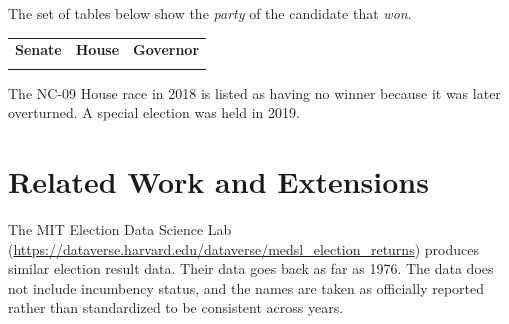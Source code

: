 \documentclass[12pt]{article}
\begin{document}
The set of tables below show the \emph{party} of the candidate that \emph{won}.

    \begin{tabularx}{\linewidth}{CCC}
    \textbf{Senate} & \textbf{House} & \textbf{Governor}\\
     &  & 
    \end{tabularx}

The NC-09 House race in 2018 is listed as having no winner because it was later overturned. A special election was held in 2019.





\section{Related Work and Extensions}

The MIT Election Data Science Lab (\url{https://dataverse.harvard.edu/dataverse/medsl\_election\_returns}) produces similar election result data. Their data goes back as far as 1976. The data does not include incumbency status, and the names are taken as officially reported rather than standardized to be consistent across years.
\end{document}
